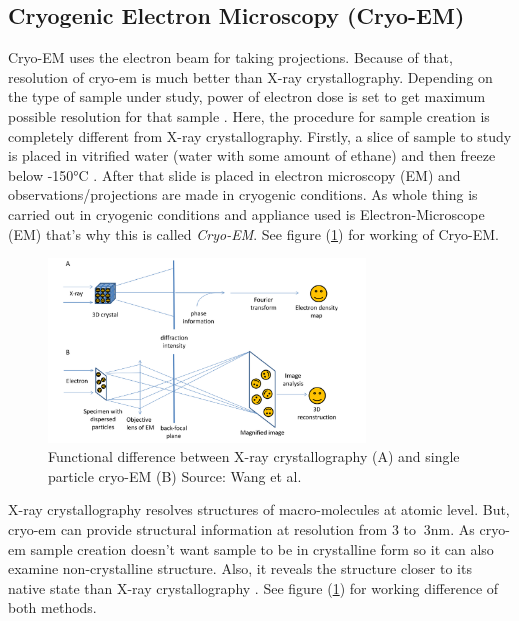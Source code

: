 \documentclass[twoside]{iitbreport}
\begin{document}
\subsection{Cryogenic Electron Microscopy (Cryo-EM) }
Cryo-EM uses the electron beam for taking projections. Because of that, resolution of cryo-em is much better than X-ray crystallography. Depending on the type of sample under study, power of electron dose is set 
to get maximum possible resolution for that sample \cite{diebolder2012pushing}. Here, the procedure for sample creation is completely different from X-ray crystallography. Firstly, a slice of sample to study is placed in vitrified water (water with some amount of ethane) and then freeze below \ang{-150}C \cite{diebolder2012pushing} \cite{wang2017cryo_crystal}. After that slide is placed in electron microscopy (EM) and observations/projections are made in cryogenic conditions. As whole thing is carried out in cryogenic conditions and appliance used is Electron-Microscope (EM) that's why this is called \textit{Cryo-EM}. See figure (\ref{fig:xray_crystal_cryoem}) for working of Cryo-EM.

\begin{figure}[H]
\includegraphics[width=0.75\textwidth]{xray_crystal_cryoem}
\centering
\captionsetup{justification=centering}
\caption{ Functional difference between X-ray crystallography (A) and single particle cryo-EM (B) Source: Wang et al. \cite{wang2017cryo_crystal}}
\label{fig:xray_crystal_cryoem}
\end{figure}

\noindent
X-ray crystallography resolves structures of macro-molecules at atomic level. But, cryo-em can provide structural information at resolution from 3\text{\AA} to $~$3nm. As cryo-em sample creation doesn't want sample to be in crystalline form so it can also examine non-crystalline structure. Also, it reveals the structure  closer to its native state than X-ray crystallography \cite{wang2017cryo_crystal}. See figure (\ref{fig:xray_crystal_cryoem}) for working difference of both methods.
\end{document}

